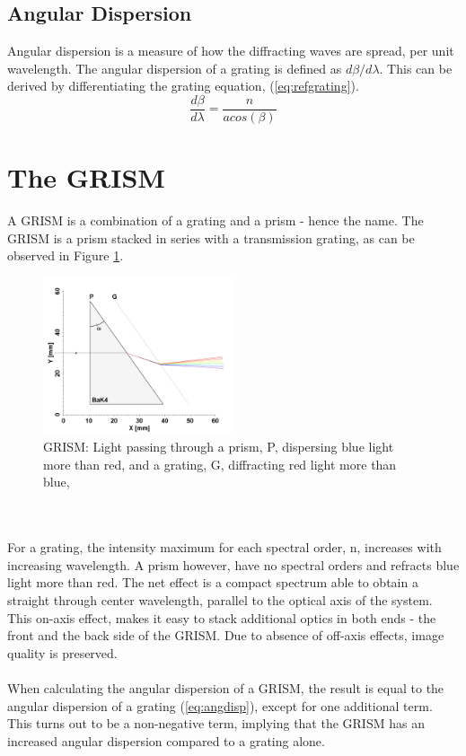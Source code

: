 \subsection{Angular Dispersion}
Angular dispersion is a measure of how the diffracting waves are spread, per unit wavelength. The angular dispersion of a grating is defined as $d\beta/d\lambda$. This can be derived by differentiating the grating equation, (\ref{eq:refgrating}). 
\begin{equation}
    \frac{d\beta}{d\lambda} = \frac{n}{a cos(\beta)}
    \label{eq:angdisp}
\end{equation}

\section{The GRISM} \label{sec:grism}
A GRISM is a combination of a grating and a prism - hence the name. The GRISM is a prism stacked in series with a transmission grating, as can be observed in Figure \ref{fig:grism}.
\begin{figure}[H]
    \centering
    \includegraphics[width=0.5\textwidth]{Images/theory/GRISM.png}
    \caption[GRISM]{GRISM: Light passing through a prism, P, dispersing blue light more than red, and a grating, G, diffracting red light more than blue, \cite{sigernes2018}}
    \label{fig:grism}
\end{figure}
\\\\
\noindent
For a grating, the intensity maximum for each spectral order, n, increases with increasing wavelength. A prism however, have no spectral orders and refracts blue light more than red. The net effect is a compact spectrum able to obtain a straight through center wavelength, parallel to the optical axis of the system. This on-axis effect, makes it easy to stack additional optics in both ends - the front and the back side of the GRISM. Due to absence of off-axis effects, image quality is preserved.
\\\\
When calculating the angular dispersion of a GRISM, the result is equal to the angular dispersion of a grating (\ref{eq:angdisp}), except for one additional term. This turns out to be a non-negative term, implying that the GRISM has an increased angular dispersion compared to a grating alone.

